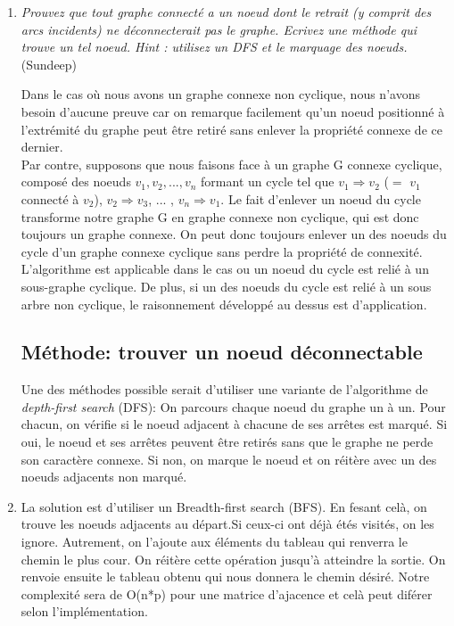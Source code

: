 \documentclass[11pt]{article}
\begin{document}
\begin{enumerate}
\item \textit{Prouvez que tout graphe connecté a un noeud dont le retrait (y comprit des arcs incidents) ne déconnecterait pas le graphe. Ecrivez une méthode qui trouve un
tel noeud. Hint : utilisez un DFS et le marquage des noeuds.} (Sundeep) \medskip

Dans le cas où nous avons un graphe connexe non cyclique, nous n'avons besoin d'aucune preuve car on remarque facilement qu'un noeud positionné à l'extrémité du graphe peut être retiré sans enlever la propriété connexe de ce dernier.\\
Par contre, supposons que nous faisons face à un graphe G connexe cyclique, composé des noeuds $v_1, v_2, ..., v_n$ formant un cycle tel que $v_1 \Rightarrow v_2$ ($=$ $v_1$ connecté à $v_2$), $v_2 \Rightarrow v_3$, ... , $v_n \Rightarrow v_1$. Le fait d'enlever un noeud du cycle transforme notre graphe G en graphe connexe non cyclique, qui est donc toujours un graphe connexe. On peut donc toujours enlever un des noeuds du cycle d'un graphe connexe cyclique sans perdre la propriété de connexité. L'algorithme est applicable dans le cas ou un noeud du cycle est relié à un sous-graphe cyclique. De plus, si un des noeuds du cycle est relié à un sous arbre non cyclique, le raisonnement développé au dessus est d'application. 
\subsection*{Méthode: trouver un noeud déconnectable}
Une des méthodes possible serait d'utiliser une variante de l'algorithme de \textit{depth-first search} (DFS): On parcours chaque noeud du graphe un à un. Pour chacun, on vérifie si le noeud adjacent à chacune de ses arrêtes est marqué. Si oui, le noeud et ses arrêtes peuvent être retirés sans que le graphe ne perde son caractère connexe. Si non, on marque le noeud et on réitère avec un des noeuds adjacents non marqué.






\item La solution est d'utiliser un Breadth-first search (BFS). En fesant celà, on trouve les noeuds adjacents au départ.Si ceux-ci ont déjà étés visités, on les ignore. Autrement, on l'ajoute aux éléments du tableau qui renverra le chemin le plus cour.  On réitère cette opération jusqu'à atteindre la sortie. On renvoie ensuite le tableau obtenu qui nous donnera le chemin désiré. 
Notre complexité sera de O(n*p) pour une matrice d'ajacence et celà peut diférer selon l'implémentation.


\end{enumerate}
\end{document}
